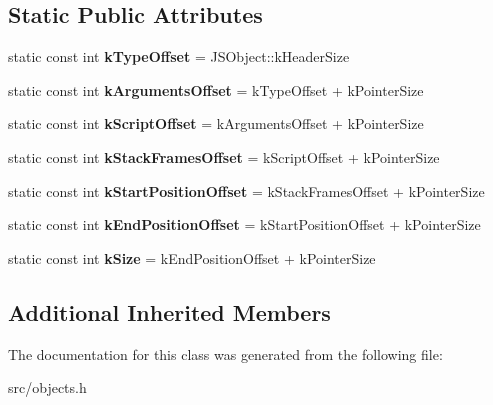 \subsection*{Static Public Attributes}
\begin{DoxyCompactItemize}
\item 
\hypertarget{classv8_1_1internal_1_1_j_s_message_object_abb3ff5762da76ef2233e253060fa1c7f}{}static const int {\bfseries k\+Type\+Offset} = J\+S\+Object\+::k\+Header\+Size\label{classv8_1_1internal_1_1_j_s_message_object_abb3ff5762da76ef2233e253060fa1c7f}

\item 
\hypertarget{classv8_1_1internal_1_1_j_s_message_object_afbd05eb4a6dc5620913a1f25efdd9f90}{}static const int {\bfseries k\+Arguments\+Offset} = k\+Type\+Offset + k\+Pointer\+Size\label{classv8_1_1internal_1_1_j_s_message_object_afbd05eb4a6dc5620913a1f25efdd9f90}

\item 
\hypertarget{classv8_1_1internal_1_1_j_s_message_object_a56601869f06fd680de6f217db4abf7dc}{}static const int {\bfseries k\+Script\+Offset} = k\+Arguments\+Offset + k\+Pointer\+Size\label{classv8_1_1internal_1_1_j_s_message_object_a56601869f06fd680de6f217db4abf7dc}

\item 
\hypertarget{classv8_1_1internal_1_1_j_s_message_object_ab52f9e48cf5e1bc47d7a05f7448f9593}{}static const int {\bfseries k\+Stack\+Frames\+Offset} = k\+Script\+Offset + k\+Pointer\+Size\label{classv8_1_1internal_1_1_j_s_message_object_ab52f9e48cf5e1bc47d7a05f7448f9593}

\item 
\hypertarget{classv8_1_1internal_1_1_j_s_message_object_a823062d07d7010b29e0cf03af96d12f5}{}static const int {\bfseries k\+Start\+Position\+Offset} = k\+Stack\+Frames\+Offset + k\+Pointer\+Size\label{classv8_1_1internal_1_1_j_s_message_object_a823062d07d7010b29e0cf03af96d12f5}

\item 
\hypertarget{classv8_1_1internal_1_1_j_s_message_object_aa114b54714631cf3068b62e3fee2498f}{}static const int {\bfseries k\+End\+Position\+Offset} = k\+Start\+Position\+Offset + k\+Pointer\+Size\label{classv8_1_1internal_1_1_j_s_message_object_aa114b54714631cf3068b62e3fee2498f}

\item 
\hypertarget{classv8_1_1internal_1_1_j_s_message_object_ab27256e0a1d2d413a2d87163ff29efe3}{}static const int {\bfseries k\+Size} = k\+End\+Position\+Offset + k\+Pointer\+Size\label{classv8_1_1internal_1_1_j_s_message_object_ab27256e0a1d2d413a2d87163ff29efe3}

\end{DoxyCompactItemize}
\subsection*{Additional Inherited Members}


The documentation for this class was generated from the following file\+:\begin{DoxyCompactItemize}
\item 
src/objects.\+h\end{DoxyCompactItemize}
